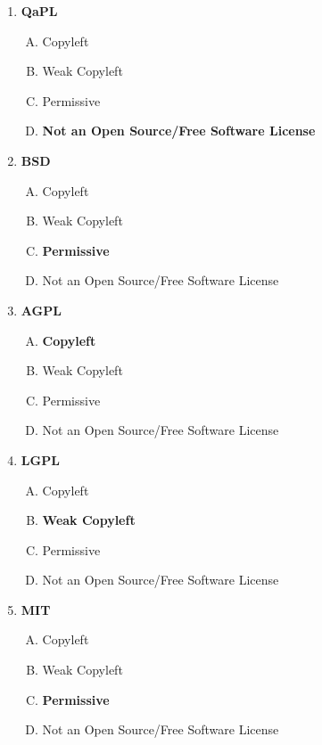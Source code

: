 \documentclass[10pt]{article}
\begin{document}
\begin{enumerate}
\begin{enumerate}[a]
\item \textbf{QaPL}

\begin{enumerate}[A.]
	\item Copyleft
	\item Weak Copyleft
	\item Permissive
	\item \textbf{Not an Open Source/Free Software License}
\end{enumerate}

\item \textbf{BSD}

\begin{enumerate}[A.]
	\item Copyleft
	\item Weak Copyleft
	\item \textbf{Permissive}
	\item Not an Open Source/Free Software License
\end{enumerate}

\item \textbf{AGPL}

\begin{enumerate}[A.]
	\item \textbf{Copyleft}
	\item Weak Copyleft
	\item Permissive
	\item Not an Open Source/Free Software License
\end{enumerate}

\item \textbf{LGPL}

\begin{enumerate}[A.]
	\item Copyleft
	\item \textbf{Weak Copyleft}
	\item Permissive
	\item Not an Open Source/Free Software License
\end{enumerate}

\item \textbf{MIT}

\begin{enumerate}[A.]
	\item Copyleft
	\item Weak Copyleft
	\item \textbf{Permissive}
	\item Not an Open Source/Free Software License
\end{enumerate}


\end{enumerate}
\end{enumerate}
\end{document}
